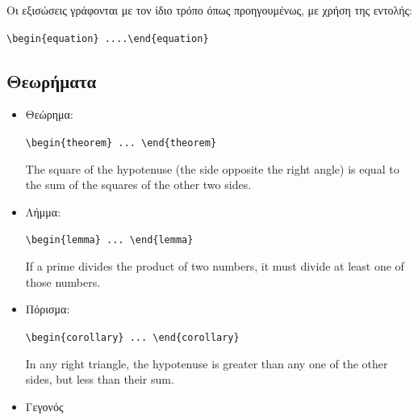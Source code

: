 Οι εξισώσεις γράφονται με τον ίδιο τρόπο όπως προηγουμένως, με
χρήση της εντολής:

\chl \bs \s\s

\verb"\begin{equation} ....\end{equation}"

\subsection{Θεωρήματα}
\label{subsec:Theorems}

\begin{itemize}
	\item Θεώρημα:

	\begin{center}\verb"\begin{theorem} ... \end{theorem}"\end{center}

	\begin{theorem}
	Τhe square of the hypotenuse (the side opposite the right angle)
	is equal to the sum of the squares of the other two sides.
	\end{theorem}

	\item Λήμμα:

	\begin{center}\verb"\begin{lemma} ... \end{lemma}"\end{center}

	\begin{lemma}
	If a prime divides the product of two numbers, it must divide at least
	one of those numbers.
	\end{lemma}
	
	\item Πόρισμα:

	\begin{center}\verb"\begin{corollary} ... \end{corollary}"\end{center}
	
	\begin{corollary}
	In any right triangle, the hypotenuse is greater than any one of the
	other sides, but less than their sum.
	\end{corollary}
	
	\item Γεγονός
	

\end{itemize}
